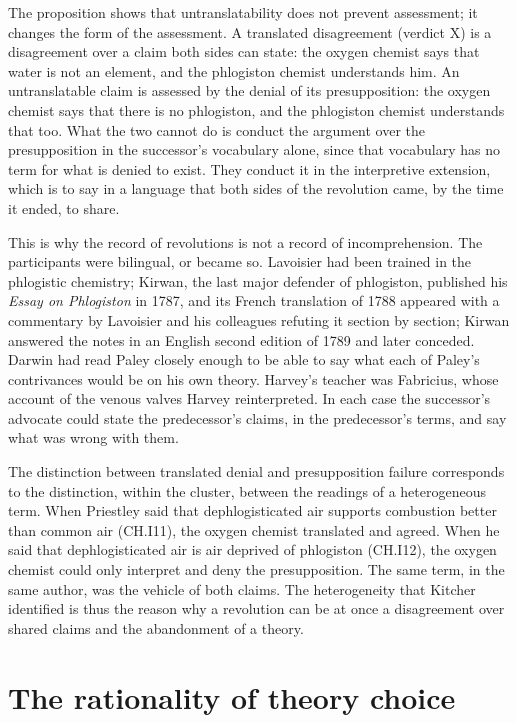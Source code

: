 \documentclass{situationist-preprint}
\begin{document}
The proposition shows that untranslatability does not prevent assessment; it changes the form of the assessment. A translated disagreement (verdict X) is a disagreement over a claim both sides can state: the oxygen chemist says that water is not an element, and the phlogiston chemist understands him. An untranslatable claim is assessed by the denial of its presupposition: the oxygen chemist says that there is no phlogiston, and the phlogiston chemist understands that too. What the two cannot do is conduct the argument over the presupposition in the successor's vocabulary alone, since that vocabulary has no term for what is denied to exist. They conduct it in the interpretive extension, which is to say in a language that both sides of the revolution came, by the time it ended, to share.

This is why the record of revolutions is not a record of incomprehension. The participants were bilingual, or became so. Lavoisier had been trained in the phlogistic chemistry; Kirwan, the last major defender of phlogiston, published his \emph{Essay on Phlogiston} in 1787, and its French translation of 1788 appeared with a commentary by Lavoisier and his colleagues refuting it section by section; Kirwan answered the notes in an English second edition of 1789 and later conceded. Darwin had read Paley closely enough to be able to say what each of Paley's contrivances would be on his own theory. Harvey's teacher was Fabricius, whose account of the venous valves Harvey reinterpreted. In each case the successor's advocate could state the predecessor's claims, in the predecessor's terms, and say what was wrong with them.

\begin{remark}\label{r:presupposition}
The distinction between translated denial and presupposition failure corresponds to the distinction, within the cluster, between the readings of a heterogeneous term. When Priestley said that dephlogisticated air supports combustion better than common air (CH.I11), the oxygen chemist translated and agreed. When he said that dephlogisticated air is air deprived of phlogiston (CH.I12), the oxygen chemist could only interpret and deny the presupposition. The same term, in the same author, was the vehicle of both claims. The heterogeneity that Kitcher identified is thus the reason why a revolution can be at once a disagreement over shared claims and the abandonment of a theory.
\end{remark}

\section{The rationality of theory choice}\label{s:rational}
\end{document}

